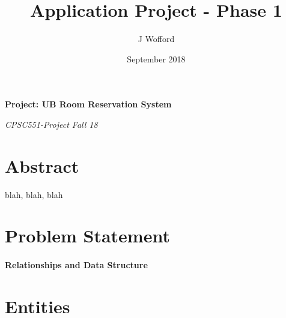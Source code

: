 \documentclass[11pt]{report}
\title{Application Project - Phase 1}
\author{J Wofford}
\date{September 2018}
\begin{document}
\raggedright


\begin{titlepage}
   \begin{center}
      \Large\textbf{Project: UB Room Reservation System}
      
     \vspace*{3\bigskipamount}
      \large\bfseries\textit{}
      
      \large\textit{CPSC551-Project Fall 18}
   \end{center}
\end{titlepage}

\section*{Abstract}
blah, blah, blah

\section*{Problem Statement}

\paragraph{Relationships and Data Structure}

\section*{Entities}
\end{document}
